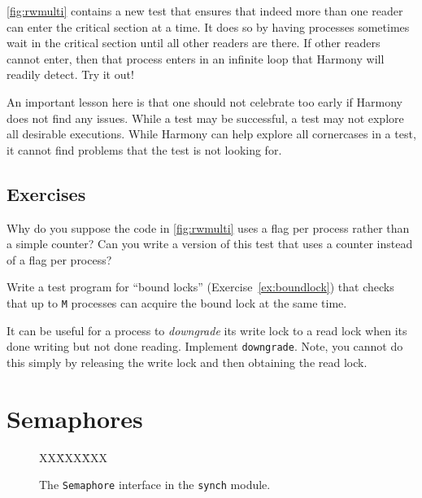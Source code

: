 \documentclass{report}
\newcommand{\harmonysource}[1]{
\begin{tabbing}
XX\=XXX\=XXX\kill
    
\end{tabbing}
}
\newenvironment{code}{
\tcolorbox
}{
\endtcolorbox
}
\begin{document}
\autoref{fig:rwmulti} contains a new test that ensures that indeed more
than one reader can enter the critical section at a time.  It does so by
having processes sometimes wait in the critical section until all other readers
are there.  If other readers cannot enter, then that process enters in an
infinite loop that Harmony will readily detect.  Try it out!

An important lesson here is that one should not celebrate too early if Harmony
does not find any issues.  While a test may be successful, a test may not
explore all desirable executions.  While Harmony can help explore all cornercases
in a test, it cannot find problems that the test is not looking for.

\section*{Exercises}
\begin{problems}
\item Why do you suppose the code in \autoref{fig:rwmulti} uses a flag
per process rather than a simple counter?
Can you write a version of this test that uses a counter instead
of a flag per process?
\item Write a test program for ``bound locks'' (Exercise~\ref{ex:boundlock})
that checks that up to \texttt{M} processes
can acquire the bound lock at the same time.
\item It can be useful for a process to \emph{downgrade} its write lock
to a read lock when its done writing but not done reading.  Implement
\texttt{downgrade}.  Note, you cannot do this simply by releasing the
write lock and then obtaining the read lock.
\end{problems}

\chapter{Semaphores}
\label{ch:semaphore}
%

%

\begin{figure}
\begin{code}
\harmonysource{semaphore}
\end{code}
\caption{The \texttt{Semaphore} interface in the \texttt{synch} module.}
\label{fig:semaphore}
\end{figure}
\end{document}
